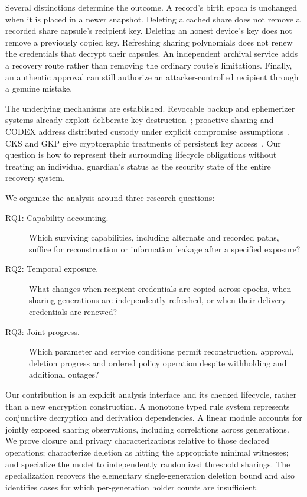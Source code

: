 \documentclass[pdflatex,sn-mathphys-num]{sn-jnl}
\theoremstyle{plain}
\theoremstyle{definition}
\begin{document}
Several distinctions determine the outcome. A record's birth epoch is unchanged when it is placed in a newer snapshot. Deleting a cached share does not remove a recorded share capsule's recipient key. Deleting an honest device's key does not remove a previously copied key. Refreshing sharing polynomials does not renew the credentials that decrypt their capsules. An independent archival service adds a recovery route rather than removing the ordinary route's limitations. Finally, an authentic approval can still authorize an attacker-controlled recipient through a genuine mistake.

The underlying mechanisms are established. Revocable backup and ephemerizer systems already exploit deliberate key destruction~\cite{boneh1996,perlman2007}; proactive sharing and CODEX address distributed custody under explicit compromise assumptions~\cite{herzberg1995,zhou2005,marsh2004}. CKS and GKP give cryptographic treatments of persistent key access~\cite{dodis2024,dodisstandard2024,backendal2026}. Our question is how to represent their surrounding lifecycle obligations without treating an individual guardian's status as the security state of the entire recovery system.

We organize the analysis around three research questions:
\begin{description}
\item[RQ1: Capability accounting.] Which surviving capabilities, including alternate and recorded paths, suffice for reconstruction or information leakage after a specified exposure?
\item[RQ2: Temporal exposure.] What changes when recipient credentials are copied across epochs, when sharing generations are independently refreshed, or when their delivery credentials are renewed?
\item[RQ3: Joint progress.] Which parameter and service conditions permit reconstruction, approval, deletion progress and ordered policy operation despite withholding and additional outages?
\end{description}

Our contribution is an explicit analysis interface and its checked lifecycle, rather than a new encryption construction. A monotone typed rule system represents conjunctive decryption and derivation dependencies. A linear module accounts for jointly exposed sharing observations, including correlations across generations. We prove closure and privacy characterizations relative to those declared operations; characterize deletion as hitting the appropriate minimal witnesses; and specialize the model to independently randomized threshold sharings. The specialization recovers the elementary single-generation deletion bound and also identifies cases for which per-generation holder counts are insufficient.
\end{document}
